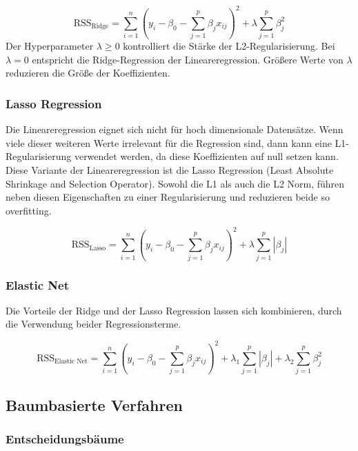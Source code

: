 \begin{equation}
\text{RSS}_{\text{Ridge}} = \sum_{i=1}^{n}(y_i - \beta_0 - \sum_{j=1}^{p}\beta_j x_{ij})^2 + \lambda \sum_{j=1}^{p}\beta_j^2
\label{eq:rss-ridge}
\end{equation}
Der Hyperparameter \(\lambda \geq 0\) kontrolliert die Stärke der L2-Regularisierung. Bei \(\lambda = 0\) entspricht die Ridge-Regression der Lineareregression. Größere Werte von \(\lambda \) reduzieren die Größe der Koeffizienten. \cite{Hastie2009}

\subsubsection{Lasso Regression}
Die Lineareregression eignet sich nicht für hoch dimensionale Datensätze. Wenn viele dieser weiteren Werte irrelevant für die Regression sind, dann kann eine L1-Regularisierung verwendet werden, da diese Koeffizienten auf null setzen kann. Diese Variante der Lineareregression ist die Lasso Regression (Least Absolute Shrinkage and Selection Operator). Sowohl die L1 als auch die L2 Norm, führen neben diesen Eigenschaften zu einer Regularisierung und reduzieren beide so overfitting. \cite{Hastie2009}

\begin{equation}
\text{RSS}_{\text{Lasso}} = \sum_{i=1}^{n}(y_i - \beta_0 - \sum_{j=1}^{p}\beta_j x_{ij})^2 + \lambda \sum_{j=1}^{p}|\beta_j|
\label{eq:reg-lasso}
\end{equation}

\subsubsection{Elastic Net}
Die Vorteile der Ridge und der Lasso Regression lassen sich kombinieren, durch die Verwendung beider Regressionsterme. \cite{Hastie2009}

\begin{equation}
\text{RSS}_{\text{Elastic Net}} = \sum_{i=1}^{n}(y_i - \beta_0 - \sum_{j=1}^{p}\beta_j x_{ij})^2 + \lambda_1 \sum_{j=1}^{p}|\beta_j| + \lambda_2 \sum_{j=1}^{p}\beta_j^2
\label{eq:reg-elastic}
\end{equation}

\subsection{Baumbasierte Verfahren}

\subsubsection{Entscheidungsbäume}

